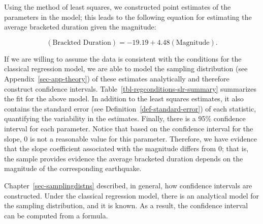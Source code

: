 \documentclass[
  letterpaper,
  DIV=11,
  numbers=noendperiod]{scrreprt}
\theoremstyle{plain}
\theoremstyle{definition}
\theoremstyle{definition}
\theoremstyle{remark}
\begin{document}
Using the method of least squares, we constructed point estimates of the
parameters in the model; this leads to the following equation for
estimating the average bracketed duration given the magnitude:

\[(\text{Brackted Duration}) = -19.19 + 4.48(\text{Magnitude}).\]

If we are willing to assume the data is consistent with the conditions
for the classical regression model, we are able to model the sampling
distribution (see Appendix~\ref{sec-app-theory}) of these estimates
analytically and therefore construct confidence intervals.
Table~\ref{tbl-regconditions-slr-summary} summarizes the fit for the
above model. In addition to the least squares estimates, it also
contains the standard error (see Definition~\ref{def-standard-error}) of
each statistic, quantifying the variability in the estimates. Finally,
there is a 95\% confidence interval for each parameter. Notice that
based on the confidence interval for the slope, 0 is not a reasonable
value for this parameter. Therefore, we have evidence that the slope
coefficient associated with the magnitude differs from 0; that is, the
sample provides evidence the average bracketed duration depends on the
magnitude of the corresponding earthquake.

\begin{table}

\caption{\label{tbl-regconditions-slr-summary}Summary of the linear
model fit relating the bracketed duration at locations in Greece
following an earthquake with the magnitude of the event.}


\end{table}%

Chapter~\ref{sec-samplingdistns} described, in general, how confidence
intervals are constructed. Under the classical regression model, there
is an analytical model for the sampling distribution, and it is known.
As a result, the confidence interval can be computed from a formula.
\end{document}
